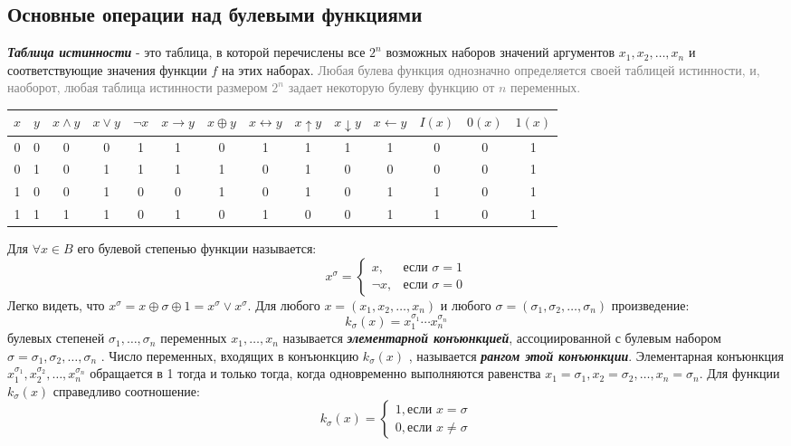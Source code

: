 \documentclass[12pt,letterpaper]{article}
\begin{document}
\subsection{Основные операции над булевыми функциями}

\textbf{\emph{Таблица истинности}} - это таблица, в которой перечислены все \(2 ^ n\)  возможных наборов значений аргументов \(x_1, x_2, \ldots, x_n\)  и соответствующие значения функции \(f\) на этих наборах. \textcolor{gray}{Любая булева функция однозначно определяется своей таблицей истинности, и, наоборот, любая таблица истинности размером \(2 ^ n\)  задает некоторую булеву функцию от \(n\) переменных.}

\begin{center}
\fontsize{10pt}{10pt}
\begin{tabular}{|c|c|c|c|c|c|c|c|c|c|c|c|c|c|}
  \hline
  \(x\) & \(y\) & \(x \wedge y\) & \(x \vee y\) & \(\neg x\) & \(x \rightarrow y\) & \(x \oplus y\) & \(x \leftrightarrow y\) & \(x \uparrow y\) & \(x \downarrow y\) & \(x \leftarrow y\) & \(I(x)\) & \(0(x)\) & \(1(x)\) \\
  \hline
  0 & 0 & 0 & 0 & 1 & 1 & 0 & 1 & 1 & 1 & 1 & 0 & 0 & 1 \\
  0 & 1 & 0 & 1 & 1 & 1 & 1 & 0 & 1 & 0 & 0 & 0 & 0 & 1 \\
  1 & 0 & 0 & 1 & 0 & 0 & 1 & 0 & 1 & 0 & 1 & 1 & 0 & 1 \\
  1 & 1 & 1 & 1 & 0 & 1 & 0 & 1 & 0 & 0 & 1 & 1 & 0 & 1 \\
  \hline
\end{tabular}
\end{center}

Для \(\forall x \in B\) его булевой степенью функции называется:
\begin{equation*}
x ^ \sigma =
  \begin{cases}
    x, & \mbox{если } \sigma = 1 \\
    \neg x, & \mbox{если } \sigma = 0
  \end{cases}
\end{equation*}
Легко видеть, что \(x ^ \sigma  = x \oplus \sigma  \oplus 1 = x ^ \sigma  \vee x ^ \sigma\). Для любого \(x = (x_1, x_2, \ldots, x_n)\) и любого \(\sigma = (\sigma_1,  \sigma_2,  \ldots, \sigma_n)\) произведение:
\[k_\sigma(x) = x_1 ^ {\sigma_1} \cdots x_n ^ {\sigma_n}\]
булевых степеней \(\sigma_1, \ldots, \sigma_n\) переменных \(x_1, \ldots, x_n\) называется \textbf{\emph{элементарной конъюнкцией}}, ассоциированной с булевым набором \(\sigma = \sigma_1, \sigma_2, \ldots, \sigma_n\) . Число переменных, входящих в конъюнкцию \(k_\sigma(x)\) , называется \textbf{\emph{рангом этой конъюнкции}}. Элементарная конъюнкция \(x_1 ^ {\sigma_1}, x_2 ^ {\sigma_2}, \ldots, x_n ^ {\sigma_n}\) обращается в 1 тогда и только тогда, когда одновременно выполняются равенства \(x_1 = \sigma_1, x_2 = \sigma_2, \ldots, x_n = \sigma_n\). Для функции \(k_\sigma(x)\) справедливо соотношение:
\begin{equation*}
k_\sigma(x) = 
  \begin{cases}
    1, \mbox{если } x = \sigma \\
    0, \mbox{если } x \neq \sigma
  \end{cases}
\end{equation*}
\end{document}
